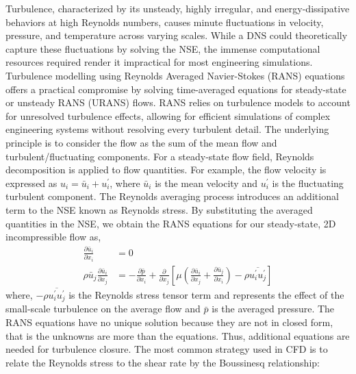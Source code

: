 Turbulence, characterized by its unsteady, highly irregular, and energy-dissipative behaviors at high Reynolds numbers, causes minute fluctuations in velocity, pressure, and temperature across varying scales. While a DNS could theoretically capture these fluctuations by solving the NSE, the immense computational resources required render it impractical for most engineering simulations. 
Turbulence modelling using Reynolds Averaged Navier-Stokes (RANS) equations offers a practical compromise by solving time-averaged equations for steady-state or unsteady RANS (URANS) flows. RANS relies on turbulence models to account for unresolved turbulence effects, allowing for efficient simulations of complex engineering systems without resolving every turbulent detail. The underlying principle is to consider the flow as the sum of the mean flow and turbulent/fluctuating components. For a steady-state flow field, Reynolds decomposition is applied to flow quantities. For example, the flow velocity is expressed as $u_i = \bar{u}_i + u_i^{\prime}$, where $\bar{u}_i$ is the mean velocity and $u_i^{\prime}$ is the fluctuating turbulent component. The Reynolds averaging process introduces an additional term to the NSE known as Reynolds stress. By substituting the averaged quantities in the NSE, we obtain the RANS equations for our steady-state, 2D incompressible flow as,
\begin{equation}
  \begin{aligned}
  \frac{\partial \bar{u}_i}{\partial x_i}&=0 \\
  \rho \bar{u}_j \frac{\partial \bar{u}_i}{\partial x_j}&= - \frac{\partial \bar{p}}{\partial x_i} + \frac{\partial}{\partial x_j}     \left[ \mu \left(\frac{\partial \bar{u}_i}{\partial x_j}+\frac{\partial \bar{u}_j}{\partial x_i}\right) - \rho \overline{u_i^{\prime} u_j^{\prime}} \right] 
  \end{aligned}
\end{equation}
where, $- \rho \overline{u_i^{\prime} u_j^{\prime}}$ is the Reynolds stress tensor term and represents the effect of the small-scale turbulence on the average flow and $\bar{p}$ is the averaged pressure. The RANS equations have no unique solution because they are not in closed form, that is the unknowns are more than the equations. Thus, additional equations are needed for turbulence closure. The most common strategy used in CFD is to relate the Reynolds stress to the shear rate by the Boussinesq relationship:
